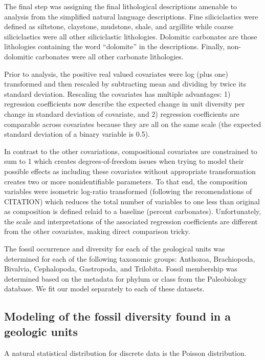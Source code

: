 \documentclass[12pt,letterpaper]{article}
\begin{document}
The final step was assigning the final lithological descriptions amenable to analysis from the simplified natural language descriptions. Fine siliciclastics were defined as siltstone, claystone, mudstone, shale, and argillite while coarse siliciclastics were all other siliciclastic lithologies. Dolomitic carbonates are those lithologies containing the word ``dolomite'' in the descriptions. Finally, non-dolomitic carbonates were all other carbonate lithologies.

Prior to analysis, the positive real valued covariates were log (plus one) transformed and then rescaled by subtracting mean and dividing by twice its standard deviation. Rescaling the covariates has multiple advantages: 1) regression coefficients now describe the expected change in unit diversity per change in standard deviation of covariate, and 2) regression coefficients are comparable across covariates because they are all on the same scale (the expected standard deviation of a binary variable is 0.5). 

In contrast to the other covariations, compositional covariates are constrained to sum to 1 which creates degrees-of-freedom issues when trying to model their possible effects as including these covariates without appropriate transformation creates two or more nonidentifiable parameters. To that end, the composition variables were isometric log-ratio transformed (following the recomendations of CITATION) which reduces the total number of variables to one less than original as composition is defined relaid to a baseline (percent carbonates). Unfortunately, the scale and interpretations of the associated regression coefficients are different from the other covariates, making direct comparison tricky.

The fossil occurrence and diversity for each of the geological units was determined for each of the following taxonomic groups: Anthozoa, Brachiopoda, Bivalvia, Cephalopoda, Gastropoda, and Trilobita. Fossil membership was determined based on the metadata for phylum or class from the Paleobiology database. We fit our model separately to each of these datasets.





\subsection{Modeling of the fossil diversity found in a geologic units}

A natural statistical distribution for discrete data is the Poisson distribution. 
\end{document}
